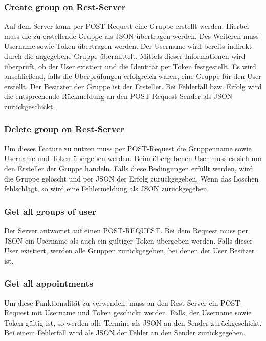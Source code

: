 \documentclass[12pt]{scrartcl}
\begin{document}
    \subsubsection{Create group on Rest-Server}
        Auf dem Server kann per POST-Request eine Gruppe erstellt werden.
        Hierbei muss die zu erstellende Gruppe als JSON übertragen werden.
        Des Weiteren muss Username sowie Token übertragen werden. Der Username wird bereits indirekt durch 
        die angegebene Gruppe übermittelt.
        Mittels dieser Informationen wird überprüft, ob der User existiert und die Identität 
        per Token festgestellt. Es wird anschließend, falls die Überprüfungen erfolgreich waren,
        eine Gruppe für den User erstellt. Der Besitzter der Gruppe ist der Ersteller.
        Bei Fehlerfall bzw. Erfolg wird die entsprechende Rückmeldung an den POST-Request-Sender 
        als JSON zurückgeschickt.

    \subsubsection{Delete group on Rest-Server}
        Um dieses Feature zu nutzen muss per POST-Request die Gruppenname sowie Username und Token übergeben werden.
        Beim übergebenen User muss es sich um den Ersteller der Gruppe handeln.
        Falls diese Bedingungen erfüllt werden, wird die Gruppe gelöscht und per JSON der Erfolg zurückgegeben.
        Wenn das Löschen fehlschlägt, so wird eine Fehlermeldung als JSON zurückgegeben. 

    \subsubsection{Get all groups of user}
        Der Server antwortet auf einen POST-REQUEST. Bei dem Request muss per JSON ein Username als auch ein gültiger Token übergeben werden.
        Falls dieser User existiert, werden alle Gruppen zurückgegeben, bei denen der User Besitzer ist.
        
    \subsubsection{Get all appointments}
        Um diese Funktionalität zu verwenden, muss an den Rest-Server ein POST-Request mit Username und Token geschickt werden.
        Falls, der Username sowie Token gültig ist, so werden alle Termine als JSON an den Sender zurückgeschickt.
        Bei einem Fehlerfall wird als JSON der Fehler an den Sender zurückgegeben.
    
\end{document}
